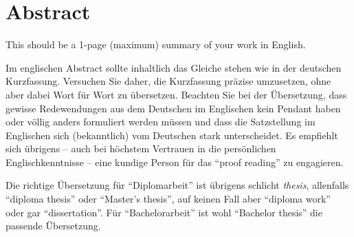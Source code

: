 \chapter{Abstract}

\begin{english} %
This should be a 1-page (maximum) summary of your work in English.
\end{english}

Im englischen Abstract sollte inhaltlich das Gleiche
stehen wie in der deutschen Kurzfassung. Versuchen Sie daher, die
Kurzfassung prä\-zise umzusetzen, ohne aber dabei Wort für Wort zu
übersetzen. Beachten Sie bei der Übersetzung, dass gewisse
Redewendungen aus dem Deutschen im Englischen kein Pendant haben
oder völlig anders formuliert werden müssen und dass die
Satzstellung im Englischen sich (bekanntlich) vom Deutschen stark
unterscheidet. Es
empfiehlt sich übrigens -- auch bei höchstem Vertrauen in die
persönlichen Englischkenntnisse -- eine kundige Person für das
"`proof reading"' zu engagieren.

Die richtige Übersetzung für "`Diplomarbeit"' ist übrigens
schlicht \emph{thesis}, allenfalls  "`diploma thesis"' oder "`Master's thesis"', 
auf keinen Fall aber "`diploma work"' oder gar "`dissertation"'. 
Für "`Bachelorarbeit"' ist wohl "`Bachelor thesis"' die passende Übersetzung. 

